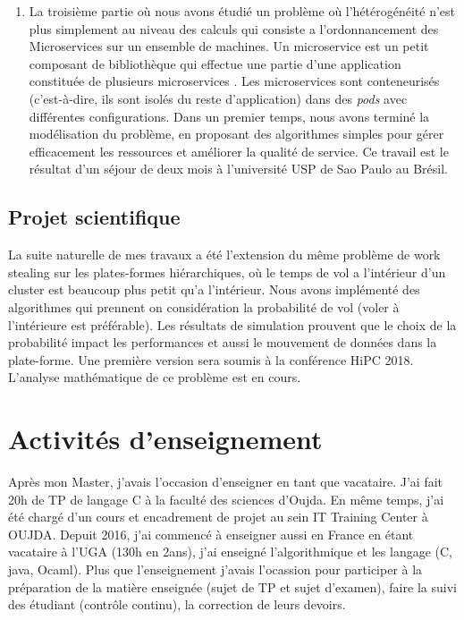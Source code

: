 \documentclass[11pt,final,french]{article}	%
\begin{document}
\begin{enumerate}
\item La troisième partie où nous avons étudié un problème où l'hétérogénéité n'est plus simplement au niveau des calculs
qui consiste a l'ordonnancement des Microservices sur un ensemble de machines.
Un microservice est un petit composant de bibliothèque qui effectue une partie d'une application
constituée de plusieurs microservices .  
Les microservices sont conteneurisés (c'est-à-dire, ils sont isolés du reste d'application) dans des \textit{pods} avec différentes configurations.
Dans un premier temps, nous avons terminé la modélisation du problème,
en proposant des algorithmes simples pour gérer efficacement les ressources
et améliorer la qualité de service. 
Ce travail est le résultat d'un séjour de deux mois à l'université USP de Sao Paulo au Brésil.
\end{enumerate}

\subsection{Projet scientifique}

La suite naturelle de mes travaux a été l'extension du même problème de work stealing sur les plates-formes hiérarchiques,
où le temps de vol a l'intérieur d'un cluster est beaucoup plus petit qu'a l'intérieur.
Nous avons implémenté des algorithmes qui prennent on considération
la probabilité de vol (voler à l'intérieure est préférable).
Les résultats de simulation prouvent que le choix de la probabilité impact
les performances et aussi le mouvement de données dans la plate-forme.
Une première version sera soumis à la conférence HiPC 2018.
L'analyse mathématique de ce problème est en cours.



\newpage

\section{Activités d'enseignement}
Après mon Master, j'avais l'occasion d'enseigner en tant que vacataire.
J'ai fait 20h de TP de langage C à la faculté des sciences d'Oujda.
En même temps, j'ai été chargé d'un cours et encadrement de projet
au sein IT Training Center à OUJDA. 
Depuit 2016, j’ai commencé à enseigner aussi en France en étant vacataire à l'UGA (130h en 2ans),
j'ai enseigné l'algorithmique et les langage (C, java, Ocaml).
Plus que l'enseignement j'avais l'ocassion pour participer à la préparation
de la matière enseignée (sujet de TP et sujet d'examen),
faire la suivi des étudiant (contrôle continu), la correction de leurs devoirs.
\end{document}
